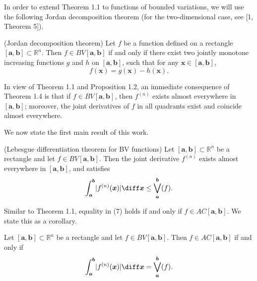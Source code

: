 \documentclass{ijclclp}
\begin{document}
In order to extend Theorem 1.1 to functions of bounded variations, we will use the following Jordan decomposition theorem (for the two-dimensional case, see [1, Theorem 5]). 

\begin{theorem}{(Jordan decomposition theorem)} Let $f$ be a function defined on a rectangle \([\boldsymbol{a},\boldsymbol{b}]\subset\mathbb R^n\). Then 
     \(f\in BV[\boldsymbol{a},\boldsymbol{b}]\) if and only if there exist two jointly monotone increasing functions \(g\) and \(h\) on \([\boldsymbol{a},\boldsymbol{b}]\), such that for any \(\boldsymbol{x}\in[\boldsymbol{a},\boldsymbol{b}]\), 
    \begin{equation}
      f(\boldsymbol{x})=g(\boldsymbol{x})-h(\boldsymbol{x}).  
    \end{equation}
\end{theorem}

In view of Theorem 1.1 and Proposition 1.2, an immediate consequence of Theorem 1.4 is that if \(f\in BV[\boldsymbol{a},\boldsymbol{b}]\), then \(f^{(n)}\) exists almost everywhere in \([\boldsymbol{a},\boldsymbol{b}]\); moreover, the joint derivatives of \(f\) in all quadrants exist and coincide almost everywhere. 

We now state the first main result of this work. 

\begin{theorem}{(Lebesgue differentiation theorem for BV functions)}
    Let \([\boldsymbol{a},\boldsymbol{b}]\subset\mathbb R^n\) be a rectangle and let \(f\in BV[\boldsymbol{a},\boldsymbol{b}]\). Then the joint derivative \(f^{(n)}\) exists almost everywhere in \([\boldsymbol{a},\boldsymbol{b}]\), and satisfies 
    \begin{equation}
        \int_{\boldsymbol{a}}^{\boldsymbol{b}}\lvert f^{(n)}(\boldsymbol{x})\rvert\diff \boldsymbol{x}\leq\bigvee_{\boldsymbol{a}}^{\boldsymbol{b}}(f).
    \end{equation}
\end{theorem}

Similar to Theorem 1.1, equality in (7) holds if and only if \(f\in AC[\boldsymbol{a},\boldsymbol{b}]\). We state this as a corollary. 

\begin{corollary}
    Let \([\boldsymbol{a},\boldsymbol{b}]\subset\mathbb R^n\) be a rectangle and let \(f\in BV[\boldsymbol{a},\boldsymbol{b}]\). Then \(f\in AC[\boldsymbol{a},\boldsymbol{b}]\) if and only if
    \[
        \int_{\boldsymbol{a}}^{\boldsymbol{b}}\lvert f^{(n)}(\boldsymbol{x})\rvert\diff \boldsymbol{x}=\bigvee_{\boldsymbol{a}}^{\boldsymbol{b}}(f).
    \]
\end{corollary}
\end{document}
